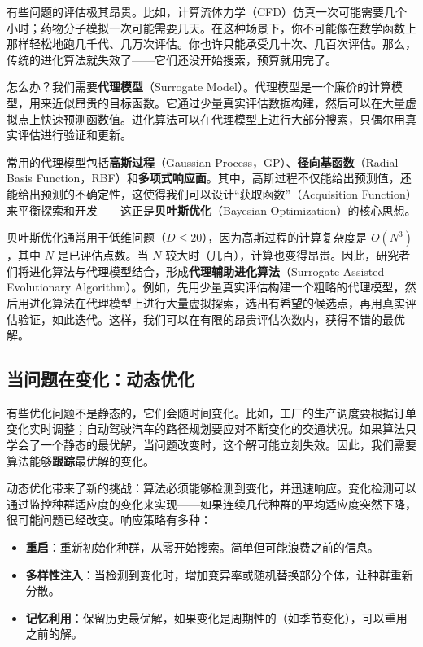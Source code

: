 \documentclass[lang=cn,zihao=-4,a4paper,fontset=windows]{beautybook}
\begin{document}
有些问题的评估极其昂贵。比如，计算流体力学（CFD）仿真一次可能需要几个小时；药物分子模拟一次可能需要几天。在这种场景下，你不可能像在数学函数上那样轻松地跑几千代、几万次评估。你也许只能承受几十次、几百次评估。那么，传统的进化算法就失效了——它们还没开始搜索，预算就用完了。

怎么办？我们需要\textbf{代理模型}（Surrogate Model）。代理模型是一个廉价的计算模型，用来近似昂贵的目标函数。它通过少量真实评估数据构建，然后可以在大量虚拟点上快速预测函数值。进化算法可以在代理模型上进行大部分搜索，只偶尔用真实评估进行验证和更新。

常用的代理模型包括\textbf{高斯过程}（Gaussian Process，GP）、\textbf{径向基函数}（Radial Basis Function，RBF）和\textbf{多项式响应面}。其中，高斯过程不仅能给出预测值，还能给出预测的不确定性，这使得我们可以设计“获取函数”（Acquisition Function）来平衡探索和开发——这正是\textbf{贝叶斯优化}（Bayesian Optimization）的核心思想。

贝叶斯优化通常用于低维问题（$D \le 20$），因为高斯过程的计算复杂度是 $O(N^3)$，其中 $N$ 是已评估点数。当 $N$ 较大时（几百），计算也变得昂贵。因此，研究者们将进化算法与代理模型结合，形成\textbf{代理辅助进化算法}（Surrogate-Assisted Evolutionary Algorithm）。例如，先用少量真实评估构建一个粗略的代理模型，然后用进化算法在代理模型上进行大量虚拟探索，选出有希望的候选点，再用真实评估验证，如此迭代。这样，我们可以在有限的昂贵评估次数内，获得不错的最优解。

\subsection{当问题在变化：动态优化}

有些优化问题不是静态的，它们会随时间变化。比如，工厂的生产调度要根据订单变化实时调整；自动驾驶汽车的路径规划要应对不断变化的交通状况。如果算法只学会了一个静态的最优解，当问题改变时，这个解可能立刻失效。因此，我们需要算法能够\textbf{跟踪}最优解的变化。

动态优化带来了新的挑战：算法必须能够检测到变化，并迅速响应。变化检测可以通过监控种群适应度的变化来实现——如果连续几代种群的平均适应度突然下降，很可能问题已经改变。响应策略有多种：

\begin{itemize}
    \item \textbf{重启}：重新初始化种群，从零开始搜索。简单但可能浪费之前的信息。
    \item \textbf{多样性注入}：当检测到变化时，增加变异率或随机替换部分个体，让种群重新分散。
    \item \textbf{记忆利用}：保留历史最优解，如果变化是周期性的（如季节变化），可以重用之前的解。
\end{itemize}
\end{document}
